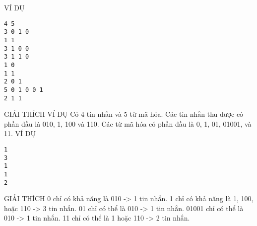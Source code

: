 VÍ DỤ
\begin{verbatim}
4 5
3 0 1 0
1 1
3 1 0 0
3 1 1 0
1 0
1 1
2 0 1
5 0 1 0 0 1
2 1 1
\end{verbatim}
GIẢI THÍCH VÍ DỤ
Có 4 tin nhắn và 5 từ mã hóa. Các tin nhắn thu được có phần đầu là 010, 1, 100 và 110. Các từ mã hóa có phần đầu là 0, 1, 01, 01001, và 11.
VÍ DỤ
\begin{verbatim}
1
3
1
1
2
\end{verbatim}
GIẢI THÍCH
0 chỉ có khả năng là 010 -> 1 tin nhắn. 1 chỉ có khả năng là 1, 100, hoặc 110 -> 3 tin nhắn. 01 chỉ có thể là 010 -> 1 tin nhắn. 01001 chỉ có thể là 010 -> 1 tin nhắn. 11 chỉ có thể là 1 hoặc 110 -> 2 tin nhắn.